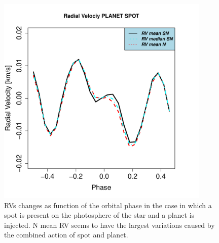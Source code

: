 \documentclass[11pt, oneside]{article}
\begin{document}
{\begin{figure}[htbp]
   \centering
\includegraphics[height = 4in]{RV_comparison_PLANET_SPOT.pdf} 
 \caption{RVs changes as function of the orbital phase in the case in which a spot is present on the photosphere of the star and a planet is injected. N mean RV seems to have the largest variations caused by the combined action of spot and planet.}
    \label{fig:spot.plus.planet}
\end{figure}

}
\end{document}
